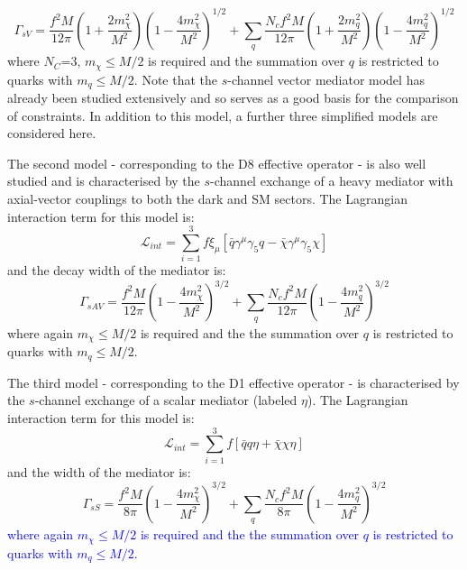 \begin{flushleft}
\begin{equation}
\label{gamma_sV}
\Gamma_{sV} = \frac{f^{2} M}{12\pi}\left(1 + \frac{2m_{\chi}^{2}}{M^{2}}\right)\left(1 - \frac{4m_{\chi}^{2}}{M^{2}}\right)^{1/2} + \sum_{\substack{q}}\frac{N_{c}f^{2}M}{12\pi}\left(1 + \frac{2m_{q}^{2}}{M^{2}}\right)\left(1 - \frac{4m_{q}^{2}}{M^{2}}\right)^{1/2}
\end{equation}
where $N_{C}$=3, $m_{\chi} \leq M/2$ is required and the summation over $q$ is restricted to quarks with $m_{q} \leq M/2$. Note that the $s$-channel vector mediator model has already been studied extensively \cite{Buchmueller:2014yoa, Chatrchyan:2013qha, Aad:2012hf, Harris:2014hga} and so serves as a good basis for the comparison of constraints. In addition to this model, a further three simplified models are considered here.

\hspace{1cm}The second model - corresponding to the D8 effective operator - is also well studied \cite{} and is characterised by the $s$-channel exchange of a heavy mediator with axial-vector couplings to both the dark and SM sectors. The Lagrangian interaction term for this model is:
\begin{equation}
\label{L_int_sAV}
\mathcal{L}_{int} = \sum\limits_{i=1}^{3} f\xi_{\mu} \left[\bar{q}\gamma^{\mu}\gamma_{5}q - \bar{\chi}\gamma^{\mu}\gamma_{5}\chi\right]
\end{equation}
and the decay width of the mediator is:
\begin{equation}
\label{gamma_sAV}
\Gamma_{sAV} = \frac{f^{2} M}{12\pi}\left(1 - \frac{4m_{\chi}^{2}}{M^{2}}\right)^{3/2} + \sum_{\substack{q}}\frac{N_{c}f^{2} M}{12\pi}\left(1 - \frac{4m_{q}^{2}}{M^{2}}\right)^{3/2}
\end{equation}
where again $m_{\chi} \leq M/2$ is required and the the summation over $q$ is restricted to quarks with $m_{q} \leq M/2$.

\hspace{1cm}The third model - corresponding to the D1 effective operator - is characterised by the $s$-channel exchange of a scalar mediator (labeled $\eta$). The Lagrangian interaction term for this model is:
\begin{equation}
\label{L_int_sS}
\mathcal{L}_{int} = \sum\limits_{i=1}^{3} f \left[\bar{q}q\eta + \bar{\chi}\chi\eta\right]
\end{equation}
and the width of the mediator is:
\begin{equation}
\label{gamma_sS}
\Gamma_{sS} = \frac{f^{2} M}{8\pi}\left(1 - \frac{4m_{\chi}^{2}}{M^{2}}\right)^{3/2} + \sum_{\substack{q}}\frac{N_{c}f^{2} M}{8\pi}\left(1 - \frac{4m_{q}^{2}}{M^{2}}\right)^{3/2}
\end{equation}
\textcolor{blue}{where again $m_{\chi} \leq M/2$ is required and the the summation over $q$ is restricted to quarks with $m_{q} \leq M/2$.}


\end{flushleft}

